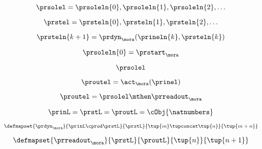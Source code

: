 \begin{forslides}
    \begin{equation}
        \label{eq:slides-processes-06}
        \prsolel = \prsoleln{0}, \prsoleln{1}, \prsoleln{2}, \ldots
    \end{equation}

    \begin{equation}
        \label{eq:slides-processes-06b}
        \prstel = \prsteln{0}, \prsteln{1}, \prsteln{2}, \ldots
    \end{equation}

    \begin{equation}
        \label{eq:slides-processes-07}
        \prsteln{k+1} = \prdyn_\mora(\prineln{k}, \prsteln{k})
    \end{equation}

    \begin{equation}
        \label{eq:slides-processes-07b}
        \prsoleln{0} = \prstart_\mora
    \end{equation}

    \begin{equation}
        \label{eq:slides-processes-08}
        \prsolel
    \end{equation}

    \begin{equation}
        \label{eq:slides-processes-09}
        \proutel = \act_{\mora}(\prinel)
    \end{equation}

    \begin{equation}
        \label{eq:slides-processes-10}
        \proutel = \prsolel \mthen \prreadout_\mora
    \end{equation}

    \begin{equation}
        \label{eq:slides-processes-11}
        \prinL = \prstL = \proutL = \cObj{\natnumbers}
    \end{equation}

    \begin{equation}
        \label{eq:slides-processes-12}
        \defmapset{
            \prdyn_\mora
        }{
            \prinL \cprod \prstL
        }{
            \prstL
        }{
            \tup{m} \tupconcat \tup{n}
        }{
            \tup{m + n}
        }
    \end{equation}

    \begin{equation}
        \label{eq:slides-processes-13}
        \defmapset{
            \prreadout_\mora
        }{
            \prstL
        }{
            \proutL
        }{
            \tup{n}
        }{
            \tup{n+1}
        }
    \end{equation}


\end{forslides}
